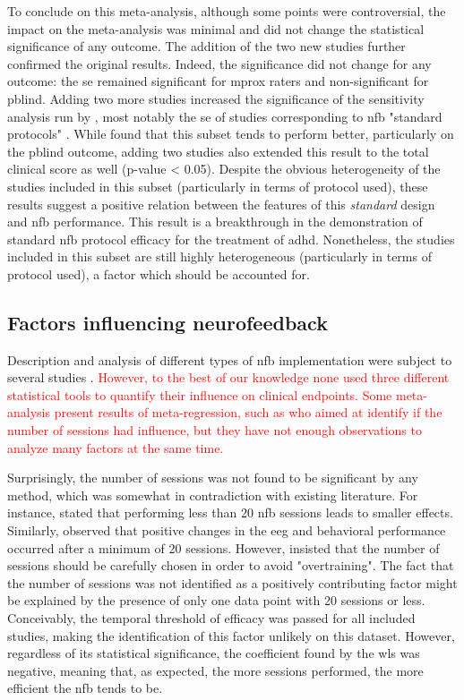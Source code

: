 To conclude on this meta-analysis, although some points were controversial, the impact on the
meta-analysis was minimal and did not change the statistical significance of any outcome. 
The addition of the two new studies \citep{Strehl2017, Baumeister2016} further confirmed the original results. Indeed, the
significance did not change for any outcome: the \gls{se} remained significant for \gls{mprox} raters and
non-significant for \gls{pblind}. Adding two more studies increased the significance of the sensitivity analysis run by
\citeauthor{Cortese2016}, most notably the \gls{se} of studies corresponding to \gls{nfb} "standard protocols" \citep{Arns2014}. 
While \citeauthor{Cortese2016} found that this subset tends to perform better, particularly on the \gls{pblind} outcome, 
adding two studies also extended this result to the total clinical score as well (p-value < 0.05). Despite the obvious heterogeneity 
of the studies included in this subset (particularly in terms of protocol used), these results suggest a positive relation 
between the features of this \emph{standard} design and \gls{nfb} performance. This result is a breakthrough in the demonstration 
of standard \gls{nfb} protocol efficacy for the treatment of \gls{adhd}. Nonetheless, the  studies 
included in this subset are still highly heterogeneous (particularly in terms of protocol used), a factor which should be accounted for.


\subsection{Factors influencing neurofeedback}

Description and analysis of different types of \gls{nfb} implementation were subject to several studies \citep{Arns2014, 
Enriquez2017, Vernon2004, Jeunet2018}. \textcolor{red}{However, to the best of our knowledge none used three different statistical tools to quantify their influence on
clinical endpoints. Some meta-analysis present results of meta-regression, such as \citep{Cortese2016} who aimed at identify if the number of sessions had influence, but 
they have not enough observations to analyze many factors at the same time.}

Surprisingly, the number of sessions was not found to be significant by any method, which was somewhat
in contradiction with existing literature. For instance, \citet{Arns2014} stated that performing less than
20 \gls{nfb} sessions leads to smaller effects. Similarly, \citet{Vernon2004} observed that positive changes in the \gls{eeg}
and behavioral performance occurred after a minimum of 20 sessions. However, \citet{Enriquez2017} insisted that the number of
sessions should be carefully chosen in order to avoid "overtraining". The fact that the number of sessions was not identified as a 
positively contributing factor might be explained by the presence of only one data point with 20 sessions or less. Conceivably, 
the temporal threshold of efficacy was passed for all included studies, making the identification of this factor unlikely on 
this dataset. However, regardless of its statistical significance, the coefficient found by the \gls{wls} was negative, meaning 
that, as expected, the more sessions performed, the more efficient the \gls{nfb} tends to be. 

